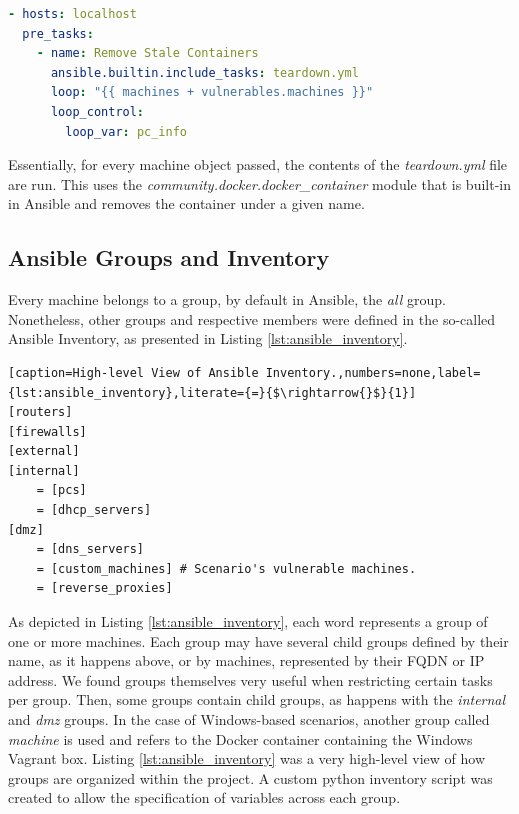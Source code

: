 \begin{lstlisting}[language=yaml,caption=Removal of Stale Containers.,numbers=none,label={lst:ansible_removal_of_stale_containers}]
- hosts: localhost
  pre_tasks:
    - name: Remove Stale Containers
      ansible.builtin.include_tasks: teardown.yml
      loop: "{{ machines + vulnerables.machines }}"
      loop_control:
        loop_var: pc_info
\end{lstlisting}

Essentially, for every machine object passed, the contents of the \textit{teardown.yml} file are run. This uses the \textit{community.docker.docker\_container} module that is built-in in Ansible and removes the container under a given name.

\subsection{Ansible Groups and Inventory} \label{sec:ansible_groups_inventory}


Every machine belongs to a group, by default in Ansible, the \textit{all} group. Nonetheless, other groups and respective members were defined in the so-called Ansible Inventory, as presented in Listing \ref{lst:ansible_inventory}.

\begin{lstlisting}[caption=High-level View of Ansible Inventory.,numbers=none,label={lst:ansible_inventory},literate={=}{$\rightarrow{}$}{1}]
[routers]
[firewalls]
[external]
[internal]
    = [pcs]
    = [dhcp_servers]
[dmz]
    = [dns_servers]
    = [custom_machines] # Scenario's vulnerable machines.
    = [reverse_proxies]
\end{lstlisting}

As depicted in Listing \ref{lst:ansible_inventory}, each word represents a group of one or more machines. Each group may have several child groups defined by their name, as it happens above, or by machines, represented by their FQDN or IP address. We found groups themselves very useful when restricting certain tasks per group. Then, some groups contain child groups, as happens with the \textit{internal} and \textit{dmz} groups. In the case of Windows-based scenarios, another group called \textit{machine} is used and refers to the Docker container containing the Windows Vagrant box. Listing \ref{lst:ansible_inventory} was a very high-level view of how groups are organized within the project. A custom python inventory script was created to allow the specification of variables across each group.

